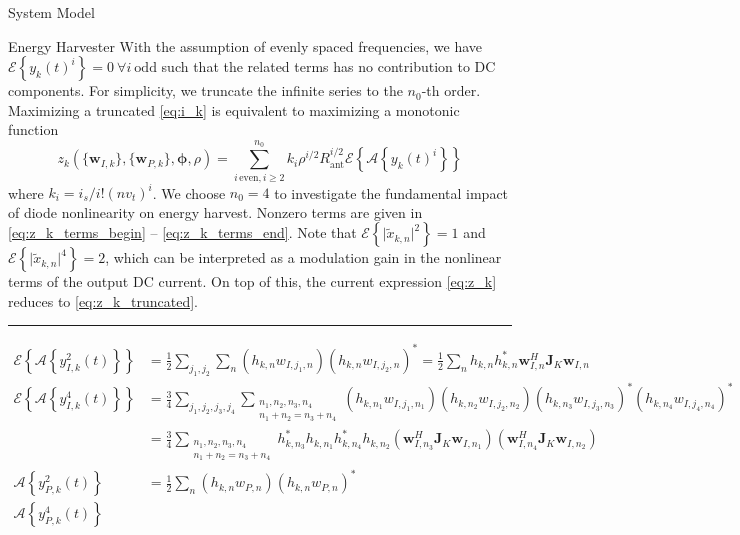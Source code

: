 \documentclass{IEEEtran}
\begin{document}
\begin{section}{System Model}
\begin{subsection}{Energy Harvester}
		With the assumption of evenly spaced frequencies, we have $\mathcal{E}\left\{y_k(t)^i\right\}=0 \ \forall i \ \mathrm{odd}$ such that the related terms has no contribution to DC components. For simplicity, we truncate the infinite series to the $n_0$-th order. Maximizing a truncated \ref{eq:i_k} is equivalent to maximizing a monotonic function \cite{Clerckx2016a}
		\begin{equation}\label{eq:z_k}
			z_k(\{\boldsymbol{w}_{I,k}\},\{\boldsymbol{w}_{P,k}\},\boldsymbol{\phi},\rho)=\sum_{i\,\text{even},i\ge2}^{n_0}{k_i}{\rho^{i/2}}{R_{\text{ant}}^{i/2}}{\mathcal{E}\left\{\mathcal{A}\left\{y_k(t)^i\right\}\right\}}
		\end{equation}
		where $k_i=i_s/i!(nv_t)^i$. We choose $n_0=4$ to investigate the fundamental impact of diode nonlinearity on energy harvest. Nonzero terms are given in \ref{eq:z_k_terms_begin} -- \ref{eq:z_k_terms_end}. Note that $\mathcal{E}\left\{\lvert\tilde{x}_{k,n}\rvert^2\right\}=1$ and $\mathcal{E}\left\{\lvert\tilde{x}_{k,n}\rvert^4\right\}=2$, which can be interpreted as a modulation gain in the nonlinear terms of the output DC current. On top of this, the current expression \ref{eq:z_k} reduces to \ref{eq:z_k_truncated}.
		\begin{figure*}[b]
			\hrule
			\begin{align}
				\mathcal{E}\left\{\mathcal{A}\left\{y_{I,k}^2(t)\right\}\right\}
				& = \frac{1}{2}\sum_{j_1,j_2}\sum_n{(h_{k,n}w_{I,j_1,n})(h_{k,n}w_{I,j_2,n})^*} = \frac{1}{2}\sum_n{h_{k,n}h_{k,n}^*{\boldsymbol{w}_{I,n}^H}{\boldsymbol{J}_{K}}{\boldsymbol{w}_{I,n}}}\label{eq:z_k_terms_begin}\\
				\mathcal{E}\left\{\mathcal{A}\left\{y_{I,k}^4(t)\right\}\right\}
				& = \frac{3}{4}\sum_{j_1,j_2,j_3,j_4}\sum_{\substack{{n_1},{n_2},{n_3},{n_4}\\{n_1}+{n_2}={n_3}+{n_4}}}{(h_{k,{n_1}}w_{I,{j_1},{n_1}})(h_{k,{n_2}}w_{I,{j_2},{n_2}})(h_{k,{n_3}}w_{I,{j_3},{n_3}})^*(h_{k,{n_4}}w_{I,{j_4},{n_4}})^*}\\
				& = \frac{3}{4}\sum_{\substack{{n_1},{n_2},{n_3},{n_4}\\{n_1}+{n_2}={n_3}+{n_4}}}{h_{k,n_3}^*h_{k,n_1}h_{k,n_4}^*h_{k,n_2}(\boldsymbol{w}_{I,n_3}^H\boldsymbol{J}_K\boldsymbol{w}_{I,n_1})(\boldsymbol{w}_{I,n_4}^H\boldsymbol{J}_K\boldsymbol{w}_{I,n_2})}\\
				\mathcal{A}\left\{y_{P,k}^2(t)\right\}
				& = \frac{1}{2}\sum_n{(h_{k,n}w_{P,n})(h_{k,n}w_{P,n})^*}\\
				\mathcal{A}\left\{y_{P,k}^4(t)\right\}

\end{align}
\end{figure*}
\end{subsection}
\end{section}
\end{document}
